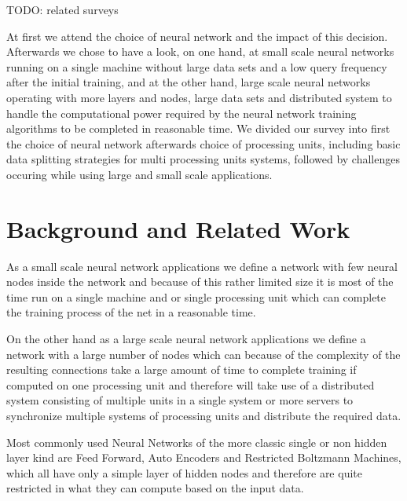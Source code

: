 \documentclass[conference]{IEEEtran}
\begin{document}
TODO: related surveys

 At first we attend the choice of neural network and the impact of this decision. Afterwards we chose to have a look, on one hand, at small scale neural networks running on a single machine without large data sets and a low query frequency after the initial training, and at the other hand, large scale neural networks operating with more layers and nodes, large data sets and distributed system to handle the computational power required by the neural network training algorithms to be completed in reasonable time. We divided our survey into first the choice of neural network afterwards choice of processing units, including basic data splitting strategies for multi processing units systems, followed by challenges occuring while using large and small scale applications.



\section{Background and Related Work}


As a small scale neural network applications we define a network with few neural nodes inside the network and because of this rather limited size it is most of the time run on a single machine and or single processing unit which can complete the training process of the net in a reasonable time.



On the other hand as a large scale neural network applications we define a network with a large number of nodes which can because of the complexity of the resulting connections take a large amount of time to complete training if computed on one processing unit and therefore will take use of a distributed system consisting of multiple units in a single system or more servers to synchronize multiple systems of processing units and distribute the required data.



Most commonly used Neural Networks of the more classic single or non hidden layer kind are Feed Forward, Auto Encoders and Restricted Boltzmann Machines, which all have only a simple layer of hidden nodes and therefore are quite restricted in what they can compute based on the input data. 
\end{document}
